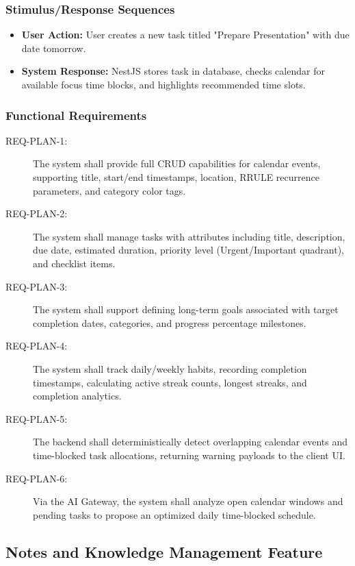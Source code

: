 \documentclass[11pt,a4paper]{article}
\begin{document}
\subsubsection{Stimulus/Response Sequences}
\begin{itemize}
    \item \textbf{User Action:} User creates a new task titled "Prepare Presentation" with due date tomorrow.
    \item \textbf{System Response:} NestJS stores task in database, checks calendar for available focus time blocks, and highlights recommended time slots.
\end{itemize}

\subsubsection{Functional Requirements}
\begin{description}
    \item[REQ-PLAN-1:] The system shall provide full CRUD capabilities for calendar events, supporting title, start/end timestamps, location, RRULE recurrence parameters, and category color tags.
    \item[REQ-PLAN-2:] The system shall manage tasks with attributes including title, description, due date, estimated duration, priority level (Urgent/Important quadrant), and checklist items.
    \item[REQ-PLAN-3:] The system shall support defining long-term goals associated with target completion dates, categories, and progress percentage milestones.
    \item[REQ-PLAN-4:] The system shall track daily/weekly habits, recording completion timestamps, calculating active streak counts, longest streaks, and completion analytics.
    \item[REQ-PLAN-5:] The backend shall deterministically detect overlapping calendar events and time-blocked task allocations, returning warning payloads to the client UI.
    \item[REQ-PLAN-6:] Via the AI Gateway, the system shall analyze open calendar windows and pending tasks to propose an optimized daily time-blocked schedule.
\end{description}

\subsection{Notes and Knowledge Management Feature}
\end{document}

